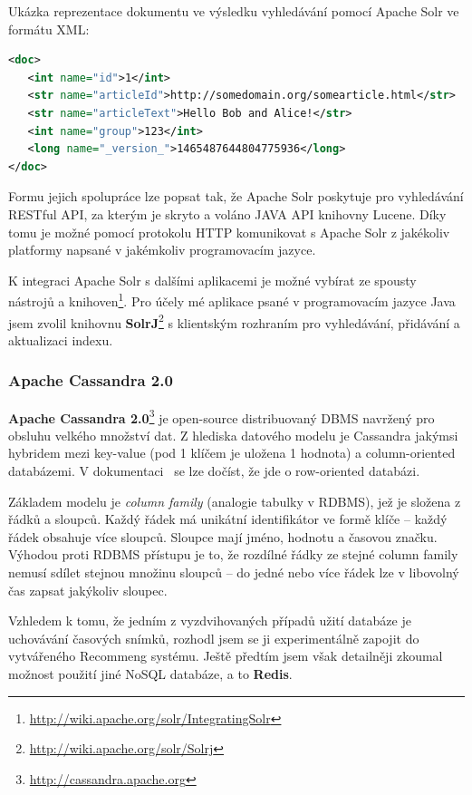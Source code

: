 \documentclass[thesis=M,czech]{FITthesis}[2014/05/07]
\begin{document}
Ukázka reprezentace dokumentu ve výsledku vyhledávání pomocí Apache Solr ve formátu XML:

\begin{lstlisting}[language=xml]
<doc>
   <int name="id">1</int>
   <str name="articleId">http://somedomain.org/somearticle.html</str>
   <str name="articleText">Hello Bob and Alice!</str>
   <int name="group">123</int>
   <long name="_version_">1465487644804775936</long>      
</doc>
\end{lstlisting}

Formu jejich spolupráce lze popsat tak, že Apache Solr poskytuje pro vyhledávání RESTful API, za kterým je skryto a voláno JAVA API knihovny Lucene. Díky tomu je možné pomocí protokolu HTTP komunikovat s Apache Solr z jakékoliv platformy napsané v jakémkoliv programovacím jazyce. 

K integraci Apache Solr s dalšími aplikacemi je možné vybírat ze spousty nástrojů a knihoven\footnote{\url{http://wiki.apache.org/solr/IntegratingSolr}}. Pro účely mé aplikace psané v programovacím jazyce Java jsem zvolil knihovnu \textbf{SolrJ}\footnote{\url{http://wiki.apache.org/solr/Solrj}} s klientským rozhraním pro vyhledávání, přidávání a aktualizaci indexu. 

\subsubsection{Apache Cassandra 2.0}
\textbf{Apache Cassandra 2.0}\footnote{\url{http://cassandra.apache.org}} je open-source distribuovaný DBMS navržený pro obsluhu velkého množství dat. Z hlediska datového modelu je Cassandra jakýmsi hybridem mezi key-value (pod 1 klíčem je uložena 1 hodnota) a column-oriented databázemi. V dokumentaci~\cite{cassdoc} se lze dočíst, že jde o row-oriented databázi.

Základem modelu je \emph{column family} (analogie tabulky v RDBMS), jež je složena z řádků a sloupců. Každý řádek má unikátní identifikátor ve formě klíče – každý řádek obsahuje více sloupců. Sloupce mají jméno, hodnotu a časovou značku. Výhodou proti RDBMS přístupu je to, že rozdílné řádky ze stejné column family nemusí sdílet stejnou množinu sloupců – do jedné nebo více řádek lze v libovolný čas zapsat jakýkoliv sloupec.

Vzhledem k tomu, že jedním z vyzdvihovaných případů užití databáze je uchovávání časových snímků, rozhodl jsem se ji experimentálně zapojit do vytvářeného Recommeng systému. Ještě předtím jsem však detailněji zkoumal možnost použití jiné NoSQL databáze, a to \textbf{Redis}. 
\end{document}
